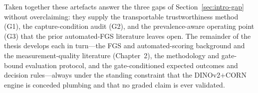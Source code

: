 Taken together these artefacts answer the three gaps of
Section~\ref{sec:intro-gap} without overclaiming: they supply the transportable
trustworthiness method (G1), the capture-condition audit (G2), and the
prevalence-aware operating point (G3) that the prior automated-FGS literature
leaves open. The remainder of the thesis develops each in turn---the FGS and
automated-scoring background and the measurement-quality literature
(Chapter~2), the methodology and gate-bound evaluation protocol, and the
gate-conditioned expected outcomes and decision rules---always under the standing
constraint that the DINOv2$+$CORN engine is conceded plumbing and that no graded
claim is ever validated.
